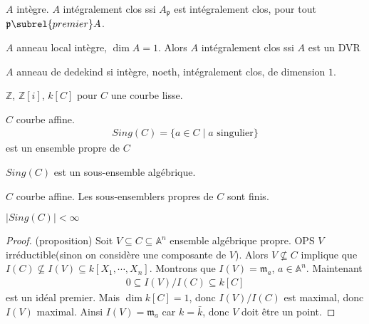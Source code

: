         \begin{theo}
            $A$ intègre. $A$ intégralement clos ssi $A_\mathfrak{p}$ est intégralement clos, pour tout $\mathfrak{p} \subrel{premier} A$.
        \end{theo}
        \begin{theo}
            $A$ anneau local intègre, $\dim A = 1$. Alors $A$ intégralement clos ssi $A$ est un DVR
        \end{theo}
        \begin{defi}
            $A$ anneau de dedekind si intègre, noeth, intégralement clos, de dimension $1$.
        \end{defi}
        \begin{expl}
            $\mathbb{Z}$, $\mathbb{Z}[i]$, $k[C]$ pour $C$ une courbe lisse.
        \end{expl}
        \begin{theo}
            $C$ courbe affine.
            \begin{align*}
                Sing(C) = \{a \in C \mid a \text{ singulier} \}
            \end{align*}
            est un ensemble propre de $C$
        \end{theo}
        \begin{exo}
            $Sing(C)$ est un sous-ensemble algébrique.
        \end{exo}
        \begin{prop}
            $C$ courbe affine. Les sous-ensemblers propres de $C$ sont finis.
        \end{prop}
        \begin{coro}
            $|Sing(C)| < \infty$
        \end{coro}
        \begin{proof} (proposition)
            Soit $V \subseteq C \subseteq \mathbb{A}^n$ ensemble algébrique propre. OPS $V$ irréductible(sinon on considère une composante de $V$). Alors $V \nsubseteq C$ implique que $I(C) \nsubseteq I(V) \subseteq k[X_1, \cdots, X_n]$. Montrons que $I(V) = \mathfrak{m}_a$, $a \in \mathbb{A}^n$. Maintenant
            \begin{align*}
                0 \subseteq I(V)/I(C) \subseteq k[C]
            \end{align*}
            est un idéal premier. Mais $\dim k[C] = 1$, donc $I(V)/I(C)$ est maximal, donc $I(V)$ maximal. Ainsi $I(V) = \mathfrak{m}_a$ car $k = \bar k$, donc $V$ doit être un point.
        \end{proof}